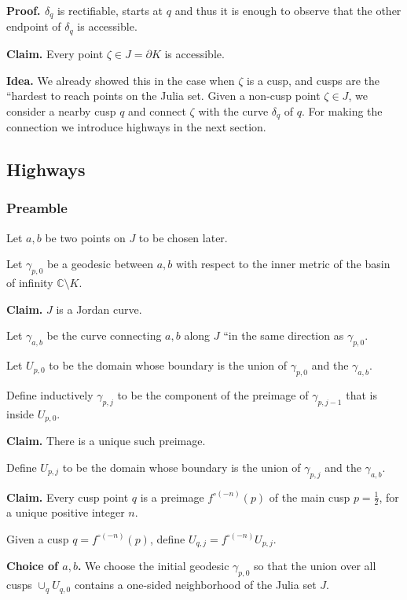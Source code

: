 \documentclass[hebrew,english]{article}
\begin{document}
\textbf{Proof. $\delta_{q}$ }is rectifiable, starts at $q$ and thus
it is enough to observe that the other endpoint of $\delta_{q}$ is
accessible.

\textbf{Claim. }Every point $\zeta\in J=\partial K$ is accessible.

\textbf{Idea. }We already showed this in the case when $\zeta$ is
a cusp, and cusps are the “hardest to reach\textquotedbl{} points
on the Julia set. Given a non-cusp point $\zeta\in J$, we consider
a nearby cusp $q$ and connect $\zeta$ with the curve $\delta_{q}$
of $q$. For making the connection we introduce \textquotedbl highways\textquotedbl{}
in the next section.


\subsection{Highways}

\subsubsection*{Preamble}

Let $a,b$ be two points on $J$ to be chosen later. 

Let $\gamma_{p,0}$ be a geodesic between $a,b$ with respect to the
inner metric of the basin of infinity $\mathbb{C}\setminus K$.

\textbf{Claim. }$J$ is a Jordan curve.

Let $\gamma_{a,b}$ be the curve connecting $a,b$ along $J$ “in
the same direction as $\gamma_{p,0}$\textquotedbl .

Let $U_{p,0}$ to be the domain whose boundary is the union of $\gamma_{p,0}$
and the $\gamma_{a,b}$.

Define inductively $\gamma_{p,j}$ to be the component of the preimage
of $\gamma_{p,j-1}$ that is inside $U_{p,0}$.

\textbf{Claim. }There is a unique such preimage.

Define $U_{p,j}$ to be the domain whose boundary is the union of
$\gamma_{p,j}$ and the $\gamma_{a,b}$.

\textbf{Claim. }Every cusp point $q$ is a preimage $f^{\circ(-n)}(p)$
of the main cusp $p=\frac{1}{2}$, for a unique positive integer $n$.

Given a cusp $q=f^{\circ\left(-n\right)}\left(p\right)$, define $U_{q,j}=f^{\circ(-n)}U_{p,j}$.

\textbf{Choice of $a,b$. }We choose the initial geodesic $\gamma_{p,0}$
so that the union over all cusps $\cup_{q}U_{q,0}$ contains a one-sided
neighborhood of the Julia set $J$. 
\end{document}
